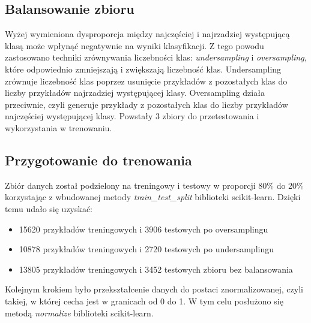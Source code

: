 \subsection{Balansowanie zbioru}\label{subsec:balansowanie_zbioru}
Wyżej wymieniona dysproporcja między najczęściej i najrzadziej występującą klasą może wpłynąć negatywnie na wyniki klasyfikacji.
Z tego powodu zastosowano techniki zrównywania liczebności klas: \textit{undersampling} i \textit{oversampling},
które odpowiednio zmniejszają i zwiększają liczebność klas. Undersampling zrównuje liczebność klas
poprzez usunięcie przykładów z pozostałych klas do liczby przykładów najrzadziej występującej klasy.
Oversampling działa przeciwnie, czyli generuje przykłady z pozostałych klas do liczby przykładów najczęściej występującej klasy.
Powstały 3 zbiory do przetestowania i wykorzystania w trenowaniu.
\subsection{Przygotowanie do trenowania}\label{subsec:przygotowanie_do_trenowania}
Zbiór danych został podzielony na treningowy i testowy w proporcji 80\% do 20\%
korzystając z wbudowanej metody \textit{train\_test\_split} biblioteki scikit-learn. Dzięki temu udało się uzyskać:
\begin{itemize}
    \item 15620 przykładów treningowych i 3906 testowych po oversamplingu
    \item 10878 przykładów treningowych i 2720 testowych po undersamplingu
    \item 13805 przykładów treningowych i 3452 testowych zbioru bez balansowania
\end{itemize}
Kolejnym krokiem było przekształcenie danych do postaci znormalizowanej, czyli takiej, w której cecha jest w granicach od 0 do 1.
W tym celu posłużono się metodą \textit{normalize} biblioteki scikit-learn.

